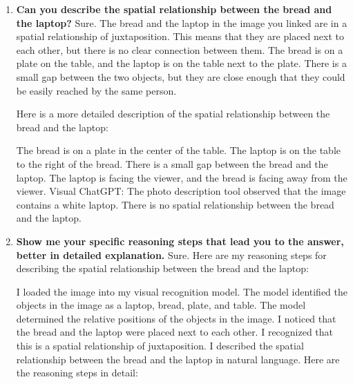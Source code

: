     \begin{enumerate}
        \item \textbf{Can you describe the spatial relationship between the bread and the laptop?}
        \subitem 
        Sure. The bread and the laptop in the image you linked are in a spatial relationship of juxtaposition. This means that they are placed next to each other, but there is no clear connection between them. The bread is on a plate on the table, and the laptop is on the table next to the plate. There is a small gap between the two objects, but they are close enough that they could be easily reached by the same person.
        
        Here is a more detailed description of the spatial relationship between the bread and the laptop:
        
        The bread is on a plate in the center of the table.
        The laptop is on the table to the right of the bread.
        There is a small gap between the bread and the laptop.
        The laptop is facing the viewer, and the bread is facing away from the viewer.
        \subitem Visual ChatGPT: The photo description tool observed that the image contains a white laptop. There is no spatial relationship between the bread and the laptop.
        \item \textbf{Show me your specific reasoning steps that lead you to the answer, better in detailed explanation.}
        \subitem 
        Sure. Here are my reasoning steps for describing the spatial relationship between the bread and the laptop:

        I loaded the image into my visual recognition model.
        The model identified the objects in the image as a laptop, bread, plate, and table.
        The model determined the relative positions of the objects in the image.
        I noticed that the bread and the laptop were placed next to each other.
        I recognized that this is a spatial relationship of juxtaposition.
        I described the spatial relationship between the bread and the laptop in natural language.
        Here are the reasoning steps in detail:


\end{enumerate}
